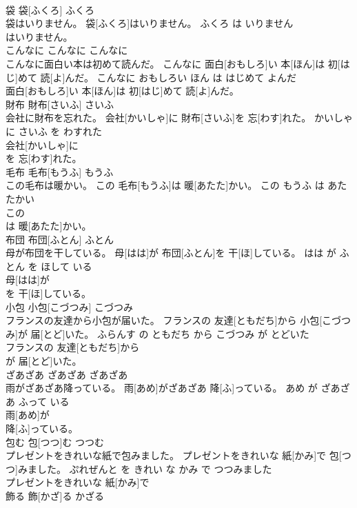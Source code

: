 \documentclass[8pt]{extreport}
\begin{document}
\begin{CJK}{UTF8}{min}
\\	袋	袋[ふくろ]	ふくろ	
\\	袋はいりません。	袋[ふくろ]はいりません。	ふくろ は いりません	
\\	はいりません。		
\\	こんなに	こんなに	こんなに	
\\	こんなに面白い本は初めて読んだ。	こんなに 面白[おもしろ]い 本[ほん]は 初[はじ]めて 読[よ]んだ。	こんなに おもしろい ほん は はじめて よんだ	
\\	面白[おもしろ]い 本[ほん]は 初[はじ]めて 読[よ]んだ。		
\\	財布	財布[さいふ]	さいふ	
\\	会社に財布を忘れた。	会社[かいしゃ]に 財布[さいふ]を 忘[わす]れた。	かいしゃ に さいふ を わすれた	
\\	会社[かいしゃ]に
\\	を 忘[わす]れた。		
\\	毛布	毛布[もうふ]	もうふ	
\\	この毛布は暖かい。	この 毛布[もうふ]は 暖[あたた]かい。	この もうふ は あたたかい	
\\	この
\\	は 暖[あたた]かい。		
\\	布団	布団[ふとん]	ふとん	
\\	母が布団を干している。	母[はは]が 布団[ふとん]を 干[ほ]している。	はは が ふとん を ほして いる	
\\	母[はは]が
\\	を 干[ほ]している。		
\\	小包	小包[こづつみ]	こづつみ	
\\	フランスの友達から小包が届いた。	フランスの 友達[ともだち]から 小包[こづつみ]が 届[とど]いた。	ふらんす の ともだち から こづつみ が とどいた	
\\	フランスの 友達[ともだち]から
\\	が 届[とど]いた。		
\\	ざあざあ	ざあざあ	ざあざあ	
\\	雨がざあざあ降っている。	雨[あめ]がざあざあ 降[ふ]っている。	あめ が ざあざあ ふって いる	
\\	雨[あめ]が
\\	降[ふ]っている。		
\\	包む	包[つつ]む	つつむ	
\\	プレゼントをきれいな紙で包みました。	プレゼントをきれいな 紙[かみ]で 包[つつ]みました。	ぷれぜんと を きれい な かみ で つつみました	
\\	プレゼントをきれいな 紙[かみ]で
\\	飾る	飾[かざ]る	かざる	

\end{CJK}
\end{document}
